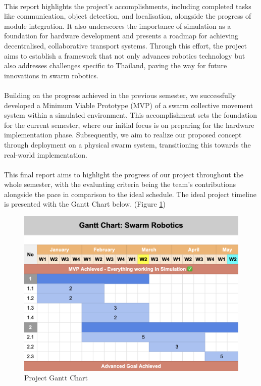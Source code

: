 \paragraph*{}
This report highlights the project’s accomplishments, including completed tasks like communication, object detection, and localisation, alongside the progress of module integration. It also underscores the importance of simulation as a foundation for hardware development and presents a roadmap for achieving decentralised, collaborative transport systems. Through this effort, the project aims to establish a framework that not only advances robotics technology but also addresses challenges specific to Thailand, paving the way for future innovations in swarm robotics.

\paragraph*{}
Building on the progress achieved in the previous semester, we successfully developed a Minimum Viable Prototype (MVP) of a swarm collective movement system within a simulated environment. This accomplishment sets the foundation for the current semester, where our initial focus is on preparing for the hardware implementation phase. Subsequently, we aim to realize our proposed concept through deployment on a physical swarm system, transitioning this towards the real-world implementation.

\paragraph*{}
This final report aims to highlight the progress of our project throughout the whole semester, with the evaluating criteria being the team's contributions alongside the pace in comparison to the ideal schedule. The ideal project timeline is presented with the Gantt Chart below. (Figure \ref{fig:gantt-chart})

\begin{figure} [H]
    \centering
    \includegraphics[width=1\linewidth]{assets/images/timeline/gantt_chart.png}
    \caption{Project Gantt Chart}
    \label{fig:gantt-chart}
\end{figure}

